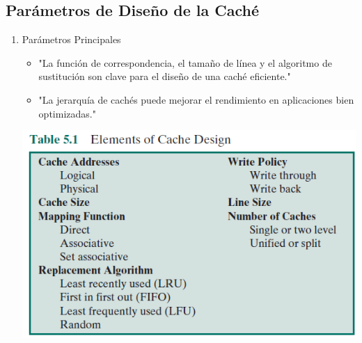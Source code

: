 \documentclass[presentation]{beamer}
\begin{document}
\subsection{Parámetros de Diseño de la Caché}
\label{sec:org325a38a}
\begin{enumerate}
\item Parámetros Principales
\label{sec:org4ad0d8c}
\begin{itemize}
\item "La función de correspondencia, el tamaño de línea y el algoritmo de sustitución son clave para el diseño de una caché eficiente."
\item "La jerarquía de cachés puede mejorar el rendimiento en aplicaciones bien optimizadas."
\end{itemize}

\begin{center}
\includegraphics[width=.9\linewidth]{./Imagenes/tabla5.1.png}
\end{center}
\end{enumerate}
\end{document}
